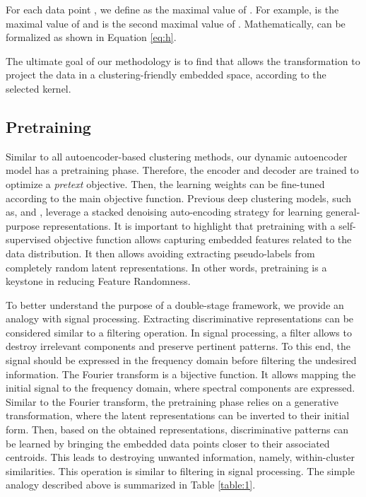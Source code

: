 \documentclass{article}
\begin{document}
For each data point , we define  as the  maximal value of . For example,  is the maximal value of  and  is the second maximal value of . Mathematically,  can be formalized as shown in Equation \ref{eq:h}.



The ultimate goal of our methodology is to find  that allows the  transformation to project the data in a clustering-friendly embedded space, according to the selected kernel.

\subsection{Pretraining}

Similar to all autoencoder-based clustering methods, our dynamic autoencoder model has a pretraining phase. Therefore, the encoder and decoder are trained to optimize a \textit{pretext} objective. Then, the learning weights can be fine-tuned according to the main objective function. Previous deep clustering models, such as, \cite{paper27} and \cite{paper28}, leverage a stacked denoising auto-encoding strategy for learning general-purpose representations. It is important to highlight that pretraining with a self-supervised objective function allows capturing embedded features related to the data distribution. It then allows avoiding extracting pseudo-labels from completely random latent representations. In other words, pretraining is a keystone in reducing Feature Randomness.

To better understand the purpose of a double-stage framework, we provide an analogy with signal processing. Extracting discriminative representations can be considered similar to a filtering operation. In signal processing, a filter allows to destroy irrelevant components and preserve pertinent patterns. To this end, the signal should be expressed in the frequency domain before filtering the undesired information. The Fourier transform is a bijective function. It allows mapping the initial signal to the frequency domain, where spectral components are expressed. Similar to the Fourier transform, the pretraining phase relies on a generative transformation, where the latent representations can be inverted to their initial form. Then, based on the obtained representations, discriminative patterns can be learned by bringing the embedded data points closer to their associated centroids. This leads to destroying unwanted information, namely, within-cluster similarities. This operation is similar to filtering in signal processing. The simple analogy described above is summarized in Table \ref{table:1}.
\end{document}
